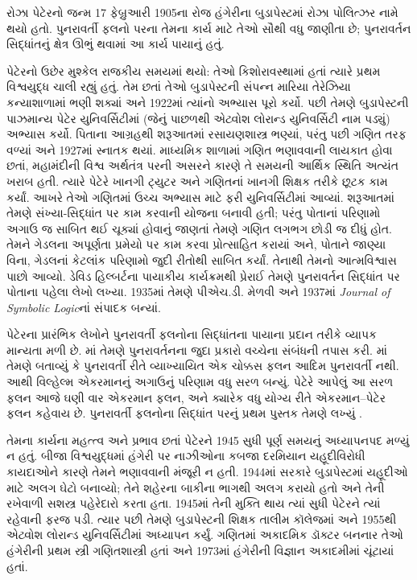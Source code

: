 \documentclass[../../../include/open-logic-section]{subfiles}
\begin{document}


 
રોઝા પેટેરનો જન્મ 17 ફેબ્રુઆરી 1905ના
રોજ હંગેરીના બુડાપેસ્ટમાં રોઝા પોલિત્ઝર
નામે થયો હતો. પુનરાવર્તી ફલનો પરના
તેમના કાર્ય માટે તેઓ સૌથી વધુ જાણીતા
છે; પુનરાવર્તન સિદ્ધાંતનું ક્ષેત્ર ઊભું
થવામાં આ કાર્ય પાયાનું હતું.

પેટેરનો ઉછેર મુશ્કેલ રાજકીય સમયમાં
થયો: તેઓ કિશોરાવસ્થામાં હતાં ત્યારે
પ્રથમ વિશ્વયુદ્ધ ચાલી રહ્યું હતું.
તેમ છતાં તેઓ બુડાપેસ્ટની સંપન્ન
મારિયા તેરેઝિયા કન્યાશાળામાં ભણી
શક્યાં અને 1922માં ત્યાંનો અભ્યાસ
પૂરો કર્યો. પછી તેમણે બુડાપેસ્ટની
પાઝમાન્ય પેટેર યુનિવર્સિટીમાં
(જેનું પાછળથી એટ્વોશ લોરાન્ડ
યુનિવર્સિટી નામ પડ્યું) અભ્યાસ
કર્યો. પિતાના આગ્રહથી શરૂઆતમાં
રસાયણશાસ્ત્ર ભણ્યાં, પરંતુ પછી
ગણિત તરફ વળ્યાં અને 1927માં
સ્નાતક થયાં. માધ્યમિક શાળામાં
ગણિત ભણાવવાની લાયકાત હોવા
છતાં, મહામંદીની વિશ્વ અર્થતંત્ર
પરની અસરને કારણે તે સમયની
આર્થિક સ્થિતિ અત્યંત ખરાબ હતી.
ત્યારે પેટેરે ખાનગી ટ્યુટર અને
ગણિતનાં ખાનગી શિક્ષક તરીકે
છૂટક કામ કર્યાં. આખરે તેઓ
ગણિતમાં ઉચ્ચ અભ્યાસ માટે
ફરી યુનિવર્સિટીમાં આવ્યાં.
શરૂઆતમાં તેમણે સંખ્યા-સિદ્ધાંત
પર કામ કરવાની યોજના બનાવી
હતી; પરંતુ પોતાનાં પરિણામો
અગાઉ જ સાબિત થઈ ચૂક્યાં
હોવાનું જાણતાં તેમણે ગણિત
લગભગ છોડી જ દીધું હોત.
તેમને ગેડલના અપૂર્ણતા
પ્રમેયો પર કામ કરવા પ્રોત્સાહિત
કરાયાં અને, પોતાને જાણ્યા
વિના, ગેડલનાં કેટલાંક પરિણામો
જુદી રીતોથી સાબિત કર્યાં.
તેનાથી તેમનો આત્મવિશ્વાસ
પાછો આવ્યો. ડેવિડ હિલ્બર્ટના
પાયાકીય કાર્યક્રમથી પ્રેરાઈ
તેમણે પુનરાવર્તન સિદ્ધાંત પર
પોતાના પહેલા લેખો લખ્યા.
1935માં તેમણે પીએચ.ડી. મેળવી
અને 1937માં \emph{Journal of
  Symbolic Logic}નાં સંપાદક બન્યાં.

પેટેરના પ્રારંભિક લેખોને
પુનરાવર્તી ફલનોના સિદ્ધાંતના
પાયાના પ્રદાન તરીકે વ્યાપક
માન્યતા મળી છે.
\cite{Peter1935a}માં તેમણે
પુનરાવર્તનના જુદા પ્રકારો
વચ્ચેના સંબંધની તપાસ કરી.
\cite{Peter1935b}માં તેમણે
બતાવ્યું કે પુનરાવર્તી રીતે
વ્યાખ્યાયિત એક ચોક્કસ ફલન
આદિમ પુનરાવર્તી નથી. આથી
વિલ્હેલ્મ એકરમાનનું અગાઉનું
પરિણામ વધુ સરળ બન્યું.
પેટેરે આપેલું આ સરળ ફલન
આજે ઘણી વાર એકરમાન ફલન,
અને ક્યારેક વધુ યોગ્ય રીતે
એકરમાન--પેટેર ફલન કહેવાય
છે. પુનરાવર્તી ફલનોના
સિદ્ધાંત પરનું પ્રથમ પુસ્તક
તેમણે લખ્યું \citep{Peter1951}.

તેમના કાર્યના મહત્ત્વ અને
પ્રભાવ છતાં પેટેરને 1945 સુધી
પૂર્ણ સમયનું અધ્યાપનપદ મળ્યું
ન હતું. બીજા વિશ્વયુદ્ધમાં
હંગેરી પર નાઝીઓના કબજા
દરમિયાન યહૂદીવિરોધી કાયદાઓને
કારણે તેમને ભણાવવાની
મંજૂરી ન હતી. 1944માં સરકારે
બુડાપેસ્ટમાં યહૂદીઓ માટે
અલગ ઘેટો બનાવ્યો; તેને
શહેરના બાકીના ભાગથી
અલગ કરાયો હતો અને તેની
રખેવાળી સશસ્ત્ર પહેરેદારો
કરતા હતા. 1945માં તેની
મુક્તિ થાય ત્યાં સુધી
પેટેરને ત્યાં રહેવાની
ફરજ પડી. ત્યાર પછી
તેમણે બુડાપેસ્ટની શિક્ષક
તાલીમ કૉલેજમાં અને
1955થી એટ્વોશ લોરાન્ડ
યુનિવર્સિટીમાં અધ્યાપન
કર્યું. ગણિતમાં અકાદમિક
ડૉક્ટર બનનાર તેઓ
હંગેરીની પ્રથમ સ્ત્રી
ગણિતશાસ્ત્રી હતાં અને
1973માં હંગેરીની વિજ્ઞાન
અકાદમીમાં ચૂંટાયાં હતાં.
\end{document}
